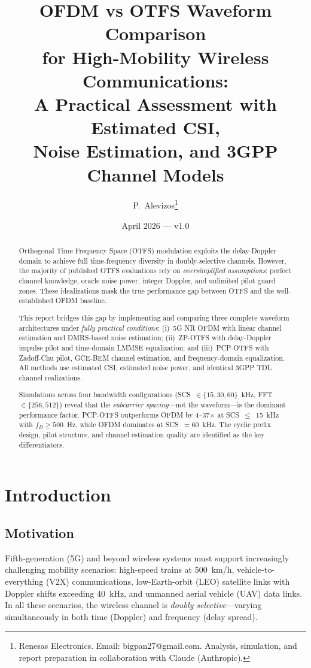 \documentclass[11pt,a4paper,twoside]{article}
\title{\Large\bfseries OFDM vs OTFS Waveform Comparison\\for High-Mobility Wireless Communications:\\[6pt]
\large A Practical Assessment with Estimated CSI,\\Noise Estimation, and 3GPP Channel Models}
\author{P.~Alevizos\thanks{Renesas Electronics. Email: bigpan27@gmail.com. Analysis, simulation, and report preparation in collaboration with Claude (Anthropic).}}
\date{April 2026 — v1.0}
\begin{document}
\maketitle
\thispagestyle{empty}

\begin{abstract}
Orthogonal Time Frequency Space (OTFS) modulation exploits the delay-Doppler domain to achieve full time-frequency diversity in doubly-selective channels. However, the majority of published OTFS evaluations rely on \emph{oversimplified assumptions}: perfect channel knowledge, oracle noise power, integer Doppler, and unlimited pilot guard zones. These idealizations mask the true performance gap between OTFS and the well-established OFDM baseline.

This report bridges this gap by implementing and comparing three complete waveform architectures under \emph{fully practical conditions}: (i)~5G NR OFDM with linear channel estimation and DMRS-based noise estimation; (ii)~ZP-OTFS with delay-Doppler impulse pilot and time-domain LMMSE equalization; and (iii)~PCP-OTFS with Zadoff-Chu pilot, GCE-BEM channel estimation, and frequency-domain equalization. All methods use estimated CSI, estimated noise power, and identical 3GPP TDL channel realizations.

Simulations across four bandwidth configurations (SCS~$\in\{15, 30, 60\}$~kHz, FFT~$\in\{256, 512\}$) reveal that the \emph{subcarrier spacing}---not the waveform---is the dominant performance factor. PCP-OTFS outperforms OFDM by 4--37$\times$ at SCS~$\leq$~15~kHz with $f_D \geq 500$~Hz, while OFDM dominates at SCS~$= 60$~kHz. The cyclic prefix design, pilot structure, and channel estimation quality are identified as the key differentiators.
\end{abstract}

\tableofcontents
\newpage

\section{Introduction}
\label{sec:intro}

\subsection{Motivation}

Fifth-generation (5G) and beyond wireless systems must support increasingly challenging mobility scenarios: high-speed trains at 500~km/h, vehicle-to-everything (V2X) communications, low-Earth-orbit (LEO) satellite links with Doppler shifts exceeding 40~kHz, and unmanned aerial vehicle (UAV) data links. In all these scenarios, the wireless channel is \emph{doubly selective}---varying simultaneously in both time (Doppler) and frequency (delay spread).
\end{document}
